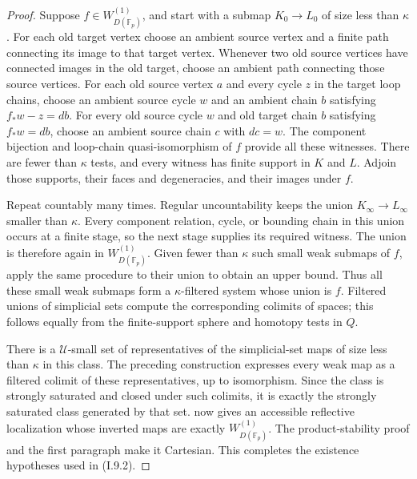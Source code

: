 \begin{proof}
Suppose $f\in W_{D(\mathbb F_p)}^{(1)}$, and start with a submap $K_0\to L_0$ of size less than $\kappa$. For each old target vertex choose an ambient source vertex and a finite path connecting its image to that target vertex. Whenever two old source vertices have connected images in the old target, choose an ambient path connecting those source vertices. For each old source vertex $a$ and every cycle $z$ in the target loop chains, choose an ambient source cycle $w$ and an ambient chain $b$ satisfying $f_*w-z=db$. For every old source cycle $w$ and old target chain $b$ satisfying $f_*w=db$, choose an ambient source chain $c$ with $dc=w$. The component bijection and loop-chain quasi-isomorphism of $f$ provide all these witnesses. There are fewer than $\kappa$ tests, and every witness has finite support in $K$ and $L$. Adjoin those supports, their faces and degeneracies, and their images under $f$.

Repeat countably many times. Regular uncountability keeps the union $K_\infty\to L_\infty$ smaller than $\kappa$. Every component relation, cycle, or bounding chain in this union occurs at a finite stage, so the next stage supplies its required witness. The union is therefore again in $W_{D(\mathbb F_p)}^{(1)}$. Given fewer than $\kappa$ such small weak submaps of $f$, apply the same procedure to their union to obtain an upper bound. Thus all these small weak submaps form a $\kappa$-filtered system whose union is $f$. Filtered unions of simplicial sets compute the corresponding colimits of spaces; this follows equally from the finite-support sphere and homotopy tests in $Q$.

There is a $\mathcal U$-small set of representatives of the simplicial-set maps of size less than $\kappa$ in this class. The preceding construction expresses every weak map as a filtered colimit of these representatives, up to isomorphism. Since the class is strongly saturated and closed under such colimits, it is exactly the strongly saturated class generated by that set. \citet[Proposition~5.5.4.15]{I9LurieHTT2009} now gives an accessible reflective localization whose inverted maps are exactly $W_{D(\mathbb F_p)}^{(1)}$. The product-stability proof and the first paragraph make it Cartesian. This completes the existence hypotheses used in (I.9.2).


\end{proof}
